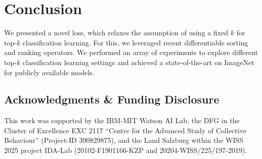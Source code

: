 \documentclass{article}
\begin{document}
\section{Conclusion}

We presented a novel loss, which relaxes the assumption of using a fixed $k$ for top-$k$ classification learning.
For this, we leveraged recent differentiable sorting and ranking operators.
We performed an array of experiments to explore different top-$k$ classification learning settings and achieved a state-of-the-art on ImageNet for publicly available models.

\subsection*{Acknowledgments \& Funding Disclosure}

This work was supported by 
the IBM-MIT Watson AI Lab, 
the DFG in the Cluster of Excellence EXC 2117 ``Centre for the Advanced Study of Collective Behaviour'' (Project-ID 390829875),
and the Land Salzburg within the WISS 2025 project IDA-Lab (20102-F1901166-KZP and 20204-WISS/225/197-2019).























  





















  
\end{document}
